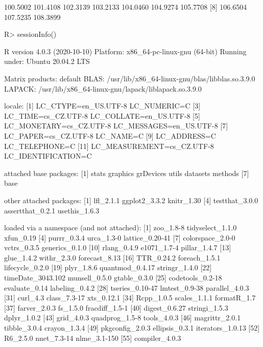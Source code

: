 \documentclass{article}\usepackage[]{graphicx}\usepackage[]{color}
\begin{document}
\begin{Schunk}
% --begin: "frbe"
\begin{Soutput}
 [1] 100.5002 101.4108 102.3139 103.2133 104.0460 104.9274 105.7708
 [8] 106.6504 107.5235 108.3899
\end{Soutput}
%
% --end: "frbe"
\end{Schunk}

\begin{Schunk}
\begin{Sinput}
R> sessionInfo()
\end{Sinput}
\begin{Soutput}
R version 4.0.3 (2020-10-10)
Platform: x86_64-pc-linux-gnu (64-bit)
Running under: Ubuntu 20.04.2 LTS

Matrix products: default
BLAS:   /usr/lib/x86_64-linux-gnu/blas/libblas.so.3.9.0
LAPACK: /usr/lib/x86_64-linux-gnu/lapack/liblapack.so.3.9.0

locale:
 [1] LC_CTYPE=en_US.UTF-8       LC_NUMERIC=C              
 [3] LC_TIME=cs_CZ.UTF-8        LC_COLLATE=en_US.UTF-8    
 [5] LC_MONETARY=cs_CZ.UTF-8    LC_MESSAGES=en_US.UTF-8   
 [7] LC_PAPER=cs_CZ.UTF-8       LC_NAME=C                 
 [9] LC_ADDRESS=C               LC_TELEPHONE=C            
[11] LC_MEASUREMENT=cs_CZ.UTF-8 LC_IDENTIFICATION=C       

attached base packages:
[1] stats     graphics  grDevices utils     datasets  methods  
[7] base     

other attached packages:
[1] lfl_2.1.1        ggplot2_3.3.2    knitr_1.30      
[4] testthat_3.0.0   assertthat_0.2.1 usethis_1.6.3   

loaded via a namespace (and not attached):
 [1] zoo_1.8-8         tidyselect_1.1.0  xfun_0.19        
 [4] purrr_0.3.4       urca_1.3-0        lattice_0.20-41  
 [7] colorspace_2.0-0  vctrs_0.3.5       generics_0.1.0   
[10] rlang_0.4.9       e1071_1.7-4       pillar_1.4.7     
[13] glue_1.4.2        withr_2.3.0       forecast_8.13    
[16] TTR_0.24.2        foreach_1.5.1     lifecycle_0.2.0  
[19] plyr_1.8.6        quantmod_0.4.17   stringr_1.4.0    
[22] timeDate_3043.102 munsell_0.5.0     gtable_0.3.0     
[25] codetools_0.2-18  evaluate_0.14     labeling_0.4.2   
[28] tseries_0.10-47   lmtest_0.9-38     parallel_4.0.3   
[31] curl_4.3          class_7.3-17      xts_0.12.1       
[34] Rcpp_1.0.5        scales_1.1.1      formatR_1.7      
[37] farver_2.0.3      fs_1.5.0          fracdiff_1.5-1   
[40] digest_0.6.27     stringi_1.5.3     dplyr_1.0.2      
[43] grid_4.0.3        quadprog_1.5-8    tools_4.0.3      
[46] magrittr_2.0.1    tibble_3.0.4      crayon_1.3.4     
[49] pkgconfig_2.0.3   ellipsis_0.3.1    iterators_1.0.13 
[52] R6_2.5.0          nnet_7.3-14       nlme_3.1-150     
[55] compiler_4.0.3   
\end{Soutput}
\end{Schunk}
\end{document}

